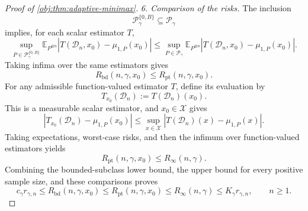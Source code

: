 \documentclass[11pt]{article}
\begin{document}
\begin{proof}[Proof of \cref{obj:thm:adaptive-minimax}]
\emph{6. Comparison of the risks.}
The inclusion
\[
\mathcal P_\gamma^{\{0,B\}}\subseteq\mathcal P_\gamma
\]
implies, for each scalar estimator \(T\),
\[
\sup_{P\in\mathcal P_\gamma^{\{0,B\}}}
\mathbb E_{P^{\otimes n}}
|T(\mathcal D_n,x_0)-\mu_{1,P}(x_0)|
\le
\sup_{P\in\mathcal P_\gamma}
\mathbb E_{P^{\otimes n}}
|T(\mathcal D_n,x_0)-\mu_{1,P}(x_0)|.
\]
Taking infima over the same estimators gives
\[
R_{\mathrm{bd}}(n,\gamma,x_0)
\le R_{\mathrm{pt}}(n,\gamma,x_0).
\]
For any admissible function-valued estimator \(T\), define its evaluation by
\[
T_{x_0}(\mathcal D_n):=T(\mathcal D_n)(x_0).
\]
This is a measurable scalar estimator, and \(x_0\in\mathcal X\) gives
\[
|T_{x_0}(\mathcal D_n)-\mu_{1,P}(x_0)|
\le
\sup_{x\in\mathcal X}
|T(\mathcal D_n)(x)-\mu_{1,P}(x)|.
\]
Taking expectations, worst-case risks, and then the infimum over function-valued estimators yields
\[
R_{\mathrm{pt}}(n,\gamma,x_0)\le R_\infty(n,\gamma).
\]
Combining the bounded-subclass lower bound, the upper bound for every positive sample size, and these comparisons proves
\[
c_\gamma r_{\gamma,n}
\le R_{\mathrm{bd}}(n,\gamma,x_0)
\le R_{\mathrm{pt}}(n,\gamma,x_0)
\le R_\infty(n,\gamma)
\le K_\gamma r_{\gamma,n},
\qquad n\ge1.
\]
\end{proof}
\end{document}
